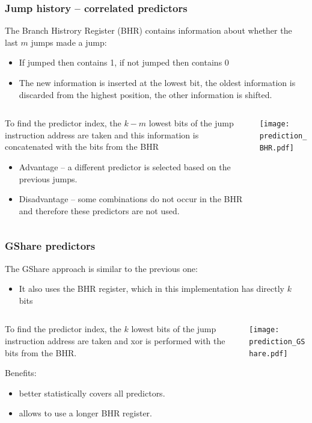 \documentclass{beamer}
\begin{document}
\begin{frame}
\frametitle{Jump history -- correlated predictors}

The Branch Histrory Register (BHR) contains information about whether the last $m$ jumps made a jump:
\begin{itemize}
\item If jumped then contains 1, if not jumped then contains 0
\item The new information is inserted at the lowest bit, the oldest information is discarded from the highest position, the other information is shifted.
\end{itemize}

\begin{columns}[T]
\begin{column}{0.5\textwidth}
\small
To find the predictor index, the $k-m$ lowest bits of the jump instruction address are taken and this information is concatenated with the bits from the BHR
\begin{itemize}
\item Advantage -- a different predictor is selected based on the previous jumps.
\item Disadvantage -- some combinations do not occur in the BHR and therefore these predictors are not used.
\end{itemize}
\end{column}
\begin{column}{0.5\textwidth}
\texttt{[image: prediction\_BHR.pdf]}
\end{column}
\end{columns}

\end{frame}

\begin{frame}
\frametitle{GShare predictors}

The GShare approach is similar to the previous one:
\begin{itemize}
\item It also uses the BHR register, which in this implementation has directly $k$ bits
\end{itemize}

\begin{columns}[T]
\begin{column}{0.5\textwidth}
\small
To find the predictor index, the $k$ lowest bits of the jump instruction address are taken and xor is performed with the bits from the BHR.

Benefits:
\begin{itemize}
\item better statistically covers all predictors.
\item allows to use a longer BHR register.
\end{itemize}
\end{column}
\begin{column}{0.5\textwidth}
\texttt{[image: prediction\_GShare.pdf]}
\end{column}
\end{columns}
\end{frame}
\end{document}
